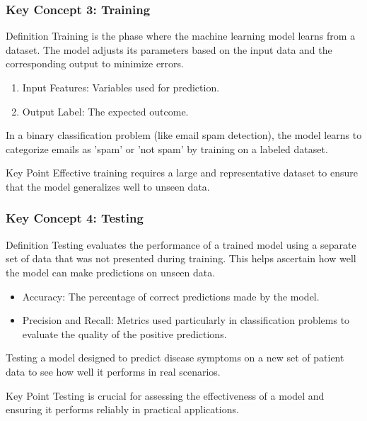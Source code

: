 \documentclass[aspectratio=169]{beamer}
\begin{document}
\begin{frame}[fragile]
    \frametitle{Key Concept 3: Training}
    \begin{block}{Definition}
        Training is the phase where the machine learning model learns from a dataset. The model adjusts its parameters based on the input data and the corresponding output to minimize errors.
    \end{block}
    \begin{enumerate}
        \item Input Features: Variables used for prediction.
        \item Output Label: The expected outcome.
    \end{enumerate}
    \begin{example}
        In a binary classification problem (like email spam detection), the model learns to categorize emails as 'spam' or 'not spam' by training on a labeled dataset.
    \end{example}
    \begin{alertblock}{Key Point}
        Effective training requires a large and representative dataset to ensure that the model generalizes well to unseen data.
    \end{alertblock}
\end{frame}

\begin{frame}[fragile]
    \frametitle{Key Concept 4: Testing}
    \begin{block}{Definition}
        Testing evaluates the performance of a trained model using a separate set of data that was not presented during training. This helps ascertain how well the model can make predictions on unseen data.
    \end{block}
    \begin{itemize}
        \item Accuracy: The percentage of correct predictions made by the model.
        \item Precision and Recall: Metrics used particularly in classification problems to evaluate the quality of the positive predictions.
    \end{itemize}
    \begin{example}
        Testing a model designed to predict disease symptoms on a new set of patient data to see how well it performs in real scenarios.
    \end{example}
    \begin{alertblock}{Key Point}
        Testing is crucial for assessing the effectiveness of a model and ensuring it performs reliably in practical applications.
    \end{alertblock}
\end{frame}
\end{document}
